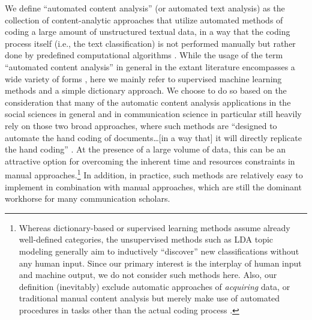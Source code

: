 \documentclass[man, 12pt, a4paper, nolmodern, noextraspace]{apa6}
\begin{document}
    We define \enquote{automated content analysis} (or automated text analysis) as the collection of content-analytic approaches that utilize automated methods of coding a large amount of unstructured textual data, in a way that the coding process itself (i.e., the text classification) is not performed manually but rather done by predefined computational algorithms \parencite{trilling2018scaling, grimmer2013text}. While the usage of the term \enquote{automated content analysis} in general in the extant literature encompasses a wide variety of forms \parencites[e.g.,][]{riff2014analyzing, Hopkins_King2010, Krippendorff2013, grimmer2013text}, here we mainly refer to supervised machine learning methods and a simple dictionary approach. We choose to do so based on the consideration that many of the automatic content analysis applications in the social sciences in general and in communication science in particular still heavily rely on those two broad approaches, where such methods are \enquote{designed to automate the hand coding of documents\ldots[in a way that] it will directly replicate the hand coding} \parencites[][p. 13]{grimmer2013text}. At the presence of a large volume of data, this can be an attractive option for overcoming the inherent time and resources constraints in manual approaches.\footnote{Whereas  dictionary-based or supervised learning methods assume already well-defined categories, the unsupervised methods such as LDA topic modeling \parencites[][]{dimaggio2013exploiting, maier2018applying} generally aim to inductively \enquote{discover} new classifications without any human input. Since our primary interest is the interplay of human input and machine output, we do not consider such methods here. Also, our definition (inevitably) exclude automatic approaches of \textit{acquiring} data, or traditional manual content analysis but merely make use of automated procedures in tasks other than the actual coding process \parencites[such as in data entry or data management: e.g.,][]{lewis2013content}.} In addition, in practice, such methods are relatively easy to implement in combination with manual approaches, which are still the dominant workhorse for many communication scholars.
    
\end{document}
